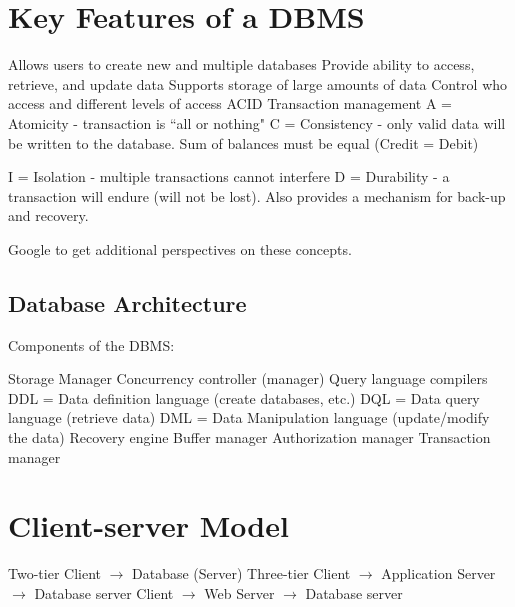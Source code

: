 \documentclass{article}
\begin{document}
\section*{Key Features of a DBMS}
 \begin{outline}[enumerate]
  \1 Allows users to create new and multiple databases
  \1 Provide ability to access, retrieve, and update data
  \1 Supports storage of large amounts of data
  \1 Control who access and different levels of access
  \1 ACID Transaction management
        \2 A = Atomicity - transaction is ``all or nothing"
        \2 C  = Consistency - only valid data will be written to the database.  Sum of balances must be equal (Credit = Debit)
 
        \2 I = Isolation - multiple transactions cannot interfere
        \2 D = Durability - a transaction will endure (will not be lost).  Also provides a mechanism for back-up and recovery.

  \end{outline}
Google to get additional perspectives on these concepts.  




\subsection*{Database Architecture}
Components of the DBMS:

\begin{outline}
        \1 Storage Manager
        \1 Concurrency controller (manager)
        \1 Query language compilers
                \2 DDL = Data definition language (create databases, etc.)
                \2 DQL = Data query language (retrieve data)
                \2 DML  = Data Manipulation language (update/modify the data)
        \1 Recovery engine
        \1 Buffer manager
        \1 Authorization manager
        \1 Transaction manager
        
\end{outline}





\section*{Client-server Model}
\begin{outline}
        \1 Two-tier
                \2 Client $\to$ Database (Server)
         \1 Three-tier 
                \2 Client $\to$ Application Server $\to$ Database server
                \2 Client $\to$ Web Server $\to$ Database server
\end{outline}
\end{document}
